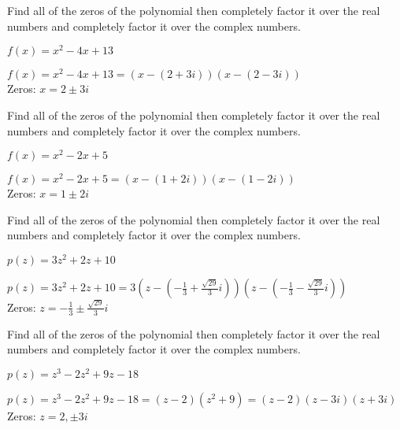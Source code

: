 \documentclass{ximera}
\begin{document}
	\author{Stitz-Zeager}





\begin{problem}\label{compfactpolyfirst}
Find all of the zeros of the polynomial then completely factor it over the real numbers and completely factor it over the complex numbers.

$f(x) = x^{2} - 4x + 13$ 

\begin{solution}
$f(x) = x^2-4x+13 = (x-(2+3i)) (x-(2-3i))$ \\
Zeros: $x = 2 \pm 3i$ 
\end{solution}


\end{problem}

\begin{problem}
Find all of the zeros of the polynomial then completely factor it over the real numbers and completely factor it over the complex numbers.

$f(x) = x^2 - 2x + 5$

\begin{solution}
$f(x) = x^2 - 2x + 5 = (x-(1+2i))(x-(1-2i))$ \\ 
Zeros:  $x = 1 \pm 2i$
\end{solution}

\end{problem}

\begin{problem}
Find all of the zeros of the polynomial then completely factor it over the real numbers and completely factor it over the complex numbers.

$p(z) = 3z^{2} + 2z + 10$

\begin{solution}
$p(z) = 3z^2 + 2z +10 = 3\left(z-\left(-\frac{1}{3} + \frac{\sqrt{29}}{3} i\right) \right) \left(z-\left(-\frac{1}{3} - \frac{\sqrt{29}}{3} i\right) \right)$ \\
Zeros:  $z = -\frac{1}{3} \pm \frac{\sqrt{29}}{3} i$

\end{solution}

\end{problem}

\begin{problem}
Find all of the zeros of the polynomial then completely factor it over the real numbers and completely factor it over the complex numbers.

$p(z) = z^3-2z^2+9z-18$

\begin{solution}
$p(z) = z^3-2z^2+9z-18 = (z-2) \left(z^2+9\right) = (z-2)(z-3i)(z+3i)$\\
Zeros:  $z=2, \pm 3i$
\end{solution}

\end{problem}
\end{document}
